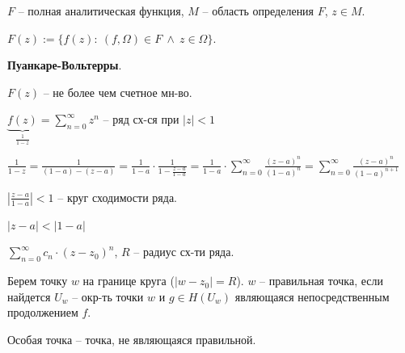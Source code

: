 \begin{definition}
    $F$ -- полная аналитическая функция, $M$ -- область определения $F$, $z \in M$.

    $F(z) := \{ f(z): \ (f, \Omega) \in F \ \land \ z \in \Omega \}$.
\end{definition}

\begin{theorem}
    \textbf{Пуанкаре-Вольтерры}.

    $F(z)$ -- не более чем счетное мн-во.
\end{theorem}

\begin{example}
    $\underbrace{f(z)}_{\frac{1}{1-z}} = \sum_{n=0}^{\infty} {z^n}$ -- ряд сх-ся при $|z| < 1$


    $\frac{1}{1 - z} = \frac{1}{(1-a) - (z - a)} = \frac{1}{1-a} \cdot \frac{1}{1 - \frac{z-a}{1-a}} = \frac{1}{1-a} \cdot \sum_{n=0}^{\infty} { \frac{(z-a)^n}{(1-a)^n} } = \sum_{n=0}^{\infty} { \frac{(z-a)^n}{(1-a)^{n+1}} }$

    $\left| \frac{z-a}{1-a} \right| < 1$ -- круг сходимости ряда.

    $|z-a| < |1-a|$

\end{example}


\begin{definition}
    $\sum_{n=0}^{\infty} { c_n \cdot (z - z_0)^n }$, $R$ -- радиус сх-ти ряда.


    Берем точку $w$ на границе круга ($|w - z_0| = R$). $w$ -- правильная точка, если найдется $U_w$ -- окр-ть точки $w$ и $g \in H(U_w)$ являющаяся непосредственным продолжением $f$. 
\end{definition}

\begin{definition}
    Особая точка -- точка, не являющаяся правильной. 
\end{definition}

